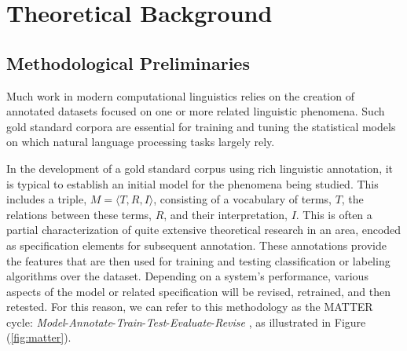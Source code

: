 \documentclass[10pt]{article}
\begin{document}


\section{Theoretical Background}

\subsection{Methodological Preliminaries}
Much work in modern computational linguistics relies on the creation of annotated datasets focused on one or more related linguistic phenomena. Such gold standard corpora are essential for training and tuning the statistical models on which natural language processing tasks largely rely.

In the development of a gold standard corpus using rich linguistic annotation, it is typical to establish an initial model for the phenomena being studied. This includes a triple, $M = \langle T,R,I \rangle$, consisting of a
vocabulary of terms, $T$, the relations between these terms, $R$, and their interpretation,
$I$. This is often a partial  characterization of quite extensive theoretical research in an area, encoded as specification elements for subsequent annotation. These annotations provide the features that are then used for training and testing classification or labeling algorithms over the dataset. Depending on a system's performance, various aspects of the model or related specification will be revised, retrained, and then retested. 
For this reason, we can refer to this methodology as the MATTER cycle: {\it Model}-{\it Annotate}-{\it Train}-{\it Test}-{\it Evaluate}-{\it Revise}  \cite{pustejovsky2012natural}, as illustrated in Figure (\ref{fig:matter}). 
\end{document}
